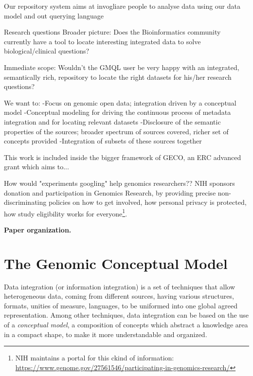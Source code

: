 \documentclass[journal]{IEEEtran}
\begin{document}
Our repository system aims at invogliare people to analyse data using our data model and out querying language






Research questions
Broader picture: Does the Bioinformatics community currently have a tool to locate 
interesting integrated data 
to solve biological/clinical questions?

Immediate scope: Wouldn’t the GMQL user be very happy with an integrated, semantically rich, repository to locate the right datasets 
for his/her research questions?



We want to:
-Focus on genomic open data; integration driven by a conceptual model
-Conceptual modeling for driving the continuous process of metadata integration and for locating relevant datasets
-Disclosure of the semantic properties of the sources; broader spectrum of sources covered, richer set of concepts provided
-Integration of subsets of these sources together

This work is included inside the bigger framework of GECO, an ERC advanced grant which aims to...

How would "experiments googling" help genomics researchers??
NIH sponsors donation and participation in Genomics Research, by providing precise non-discriminating policies on how to get involved, how personal privacy is protected, how study eligibility works for everyone\footnote{NIH maintains a portal for this ckind of information: \url{https://www.genome.gov/27561546/participating-in-genomics-research/}}.


\textbf{Paper organization.}




\section{The Genomic Conceptual Model}

Data integration (or information integration) is a set of techniques that allow heterogeneous data, coming from different sources, having various structures, formats, unities of measure, languages, to be uniformed into one global agreed representation.
Among other techniques, data integration can be based on the use of a \textit{conceptual model}, a composition of concepts which abstract a knowledge area in a compact shape, to make it more understandable and organized.
\end{document}
